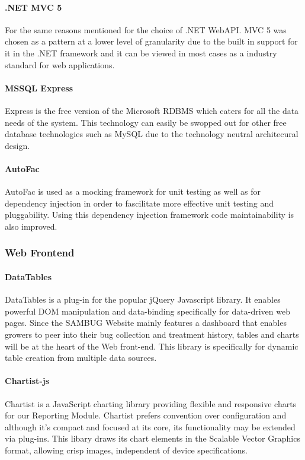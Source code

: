 \documentclass[11pt,a4paper,titlepage]{article}
\begin{document}
			\paragraph{.NET MVC 5}
				For the same reasons mentioned for the choice of .NET WebAPI. MVC 5 was chosen as a pattern at a lower level of granularity due to the built in support for it in the .NET framework and it can be viewed in most cases as a industry standard for web applications.
			\paragraph{MSSQL Express}
					Express is the free version of the Microsoft RDBMS which caters for all the data needs of the system. This technology can easily be swopped out for other free database technologies such as MySQL
					due to the technology neutral architecural design.
			\paragraph{AutoFac}
					AutoFac is used as a mocking framework for unit testing as well as for dependency injection in order to fascilitate more effective unit testing and pluggability. Using this dependency injection framework code maintainability is also improved.
		\subsubsection{Web Frontend}
			\paragraph{DataTables}
				DataTables is a plug-in for the popular jQuery Javascript library. It enables powerful DOM manipulation and data-binding specifically for data-driven web pages. Since the SAMBUG Website mainly features a dashboard that enables growers to peer into their bug collection and treatment history, tables and charts will be at the heart of the Web front-end. This library is specifically for dynamic table creation from multiple data sources.
			\paragraph{Chartist-js}
				Chartist is a JavaScript charting library providing flexible and responsive charts for our Reporting Module. Chartist prefers convention over configuration and although it's compact and focused at its core, its functionality may be extended via plug-ins. This libary draws its chart elements in the Scalable Vector Graphics format, allowing crisp images, independent of device specifications. 
\end{document}
